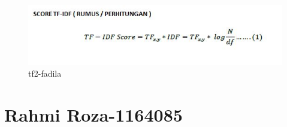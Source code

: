\begin{enumerate}
\begin{itemize}
\begin{figure}[!hbtp]
\centering
\includegraphics[scale=0.4]{figures/tf2-fadila.jpg}
\caption{tf2-fadila}
\label{tf2-fadila}
\end{figure}
\par
\par
\end{itemize}
\par
\par

\end{enumerate}




\section{Rahmi Roza-1164085}
